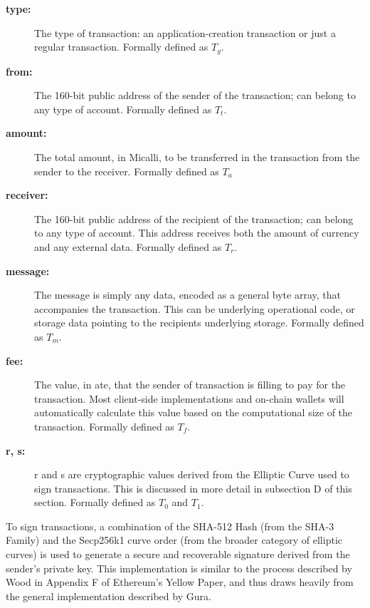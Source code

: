 \documentclass[conference]{IEEEtran}
\begin{document}
\begin{description}
\item[\textbf{type:}] The type of transaction: an application-creation transaction or just a regular transaction. Formally defined as $T_y$.
\item[\textbf{from:}] The 160-bit public address of the sender of the transaction; can belong to any type of account. Formally defined as $T_t$.
\item[\textbf{amount:}]\hspace{10}  The total amount, in Micalli, to be transferred in the transaction from the sender to the receiver. Formally defined as $T_a$
\item[\textbf{receiver:}]\hspace{10} The 160-bit public address of the recipient of the transaction; can belong to any type of account. This address receives both the amount of currency and any external data. Formally defined as $T_r$.

\item[\textbf{message:}]\hspace{10}  The message is simply any data, encoded as a general byte array, that accompanies the transaction. This can be underlying operational code, or storage data pointing to the recipients underlying storage. Formally defined as $T_m$.

\item[\textbf{fee:}] The value, in ate, that the sender of transaction is filling to pay for the transaction. Most client-side implementations and on-chain wallets will automatically calculate this value based on the computational size of the transaction. Formally defined as $T_f$.

\item[\textbf{r, s:}] r and s are cryptographic values derived from the Elliptic Curve used to sign transactions. This is discussed in more detail in subsection D of this section. Formally defined as $T_0$ and $T_1$.



\end{description}

To sign transactions, a combination of the SHA-512 Hash (from the SHA-3 Family) and the Secp256k1 curve order (from the broader category of elliptic curves) is used to generate a secure and recoverable signature derived from the sender's private key. This implementation is similar to the process described by Wood in Appendix F of Ethereum's Yellow Paper, and thus draws heavily from the general implementation described by Gura. \cite{guraSECP256k1}
\end{document}

